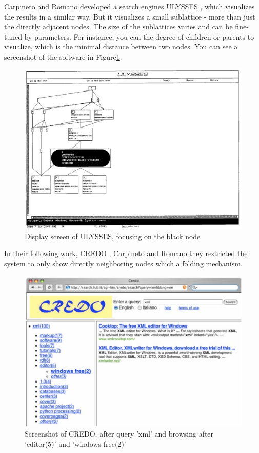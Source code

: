 \documentclass[11pt]{report}
\begin{document}
Carpineto and Romano developed a search engines ULYSSES \cite{Carpineto1995,Carpineto1996}, which visualizes the results in a similar way. But it visualizes a small sublattice - more than just the directly adjacent nodes. The size of the sublattices varies and can be fine-tuned by parameters. For instance, you can the degree of children or parents to visualize, which is the minimal distance between two nodes. You can see a screenshot of the software in Figure\ref{figure:ulysses}.

\begin{figure}[h]
\label{figure:ulysses}
	\centering
	\includegraphics[width=\linewidth]{images/ulysses}
\caption{Display screen of ULYSSES, focusing on the black node \cite{Carpineto1996} }
\end{figure}

In their following work, CREDO \cite{Carpineto2004}, Carpineto and Romano they restricted the system to only show directly neighboring nodes which a folding mechanism.

\begin{figure}[h]
\label{figure:credo}
	\centering
	\includegraphics[width=\linewidth]{images/credo}
\caption{Screenshot of CREDO, after query 'xml' and browsing after 'editor(5)' and 'windows free(2)' \cite{Carpineto2004} }
\end{figure} 
\end{document}
